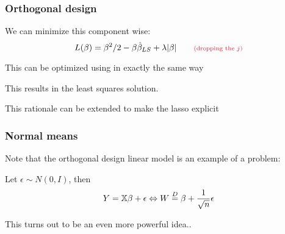 \documentclass[12pt]{beamer}
\newcommand{\parenthetical}[2]{#1  \scriptstyle \alr{( #2)}}
\begin{document}
\begin{frame}
\frametitle{Orthogonal design}
We can minimize this component wise: 
\[
L(\beta) =  \beta^2/2 - \beta \hat{\beta}_{LS} +\lambda |\beta| \parenthetical{\qquad}{\textrm{dropping the } j}
\]
\vsp

This can be optimized using  in exactly the same way



\vsp
This results in  the least squares solution.  

\vsp
This rationale can be extended to make the lasso  explicit

\end{frame}
%
%
%

\begin{frame}
\frametitle{Normal means}
Note that the orthogonal design linear model is an example of a  problem:

\vsp
Let $\epsilon \sim N(0,I)$, then
\[
Y = \mathbb{X}\beta + \epsilon \Leftrightarrow W \stackrel{D}{=} \beta + \frac{1}{\sqrt{n}} \epsilon
\]

This turns out to be an even more powerful idea..
\end{frame}
\end{document}
